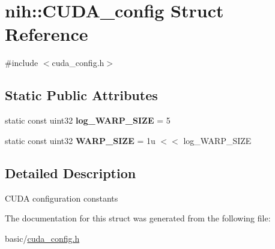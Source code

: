 \hypertarget{structnih_1_1_c_u_d_a__config}{
\section{nih\-:\-:\-C\-U\-D\-A\-\_\-config \-Struct \-Reference}
\label{structnih_1_1_c_u_d_a__config}
}


{\ttfamily \#include $<$cuda\-\_\-config.\-h$>$}

\subsection*{\-Static \-Public \-Attributes}
\begin{DoxyCompactItemize}
\item 
\hypertarget{structnih_1_1_c_u_d_a__config_a06622a5887b68908d0d23c6da620d32b}{
static const uint32 {\bfseries log\-\_\-\-W\-A\-R\-P\-\_\-\-S\-I\-Z\-E} = 5}
\label{structnih_1_1_c_u_d_a__config_a06622a5887b68908d0d23c6da620d32b}

\item 
\hypertarget{structnih_1_1_c_u_d_a__config_a913868a246ecaeb29dac5cb2ba37a9b3}{
static const uint32 {\bfseries \-W\-A\-R\-P\-\_\-\-S\-I\-Z\-E} = 1u $<$$<$ log\-\_\-\-W\-A\-R\-P\-\_\-\-S\-I\-Z\-E}
\label{structnih_1_1_c_u_d_a__config_a913868a246ecaeb29dac5cb2ba37a9b3}

\end{DoxyCompactItemize}


\subsection{\-Detailed \-Description}
\-C\-U\-D\-A configuration constants 

\-The documentation for this struct was generated from the following file\-:\begin{DoxyCompactItemize}
\item 
basic/\hyperlink{cuda__config_8h}{cuda\-\_\-config.\-h}\end{DoxyCompactItemize}
